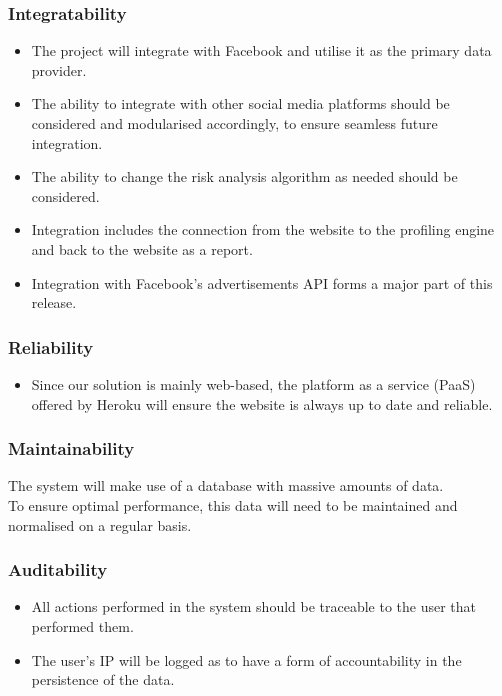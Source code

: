 \documentclass{article}
\begin{document}
		\subsubsection{Integratability}\label{subsubsec:integratability}
		\begin{itemize}
			\item The project will integrate with Facebook and utilise it as the primary data provider.
			\item The ability to integrate with other social media platforms should be considered and modularised accordingly, to ensure seamless future integration. 
			\item The ability to change the risk analysis algorithm as needed should be considered.
			\item Integration includes the connection from the website to the profiling engine and back to the website as a report.
			\item Integration with Facebook's advertisements API forms a major part of this release.
		\end{itemize}		

		\subsubsection{Reliability}
		\begin{itemize}
			\item Since our solution is mainly web-based, the platform as a service (PaaS) offered by Heroku will ensure the website is always up to date and reliable.
		\end{itemize}
		
		\subsubsection{Maintainability}
			The system will make use of a database with massive amounts of data.\\ To ensure optimal performance, this data will need to be maintained and normalised on a regular basis.

		\subsubsection{Auditability}
		\begin{itemize}
			\item All actions performed in the system should be traceable to the user that performed them.
			\item The user's IP  will be logged as to have a form of accountability in the persistence of the data.
		\end{itemize}
\end{document}
